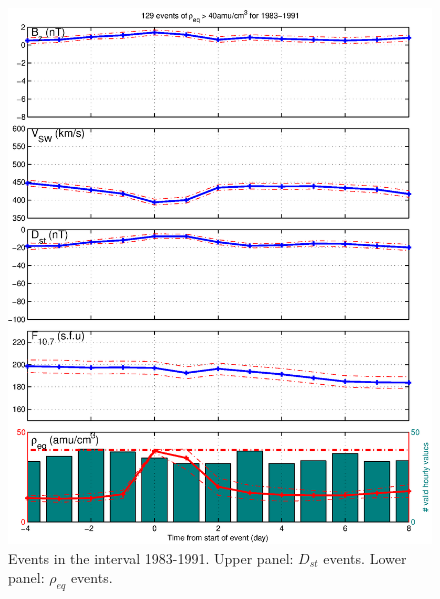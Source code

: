 \documentclass[10pt,twocolumn]{article}
\begin{document}
\begin{figure}[tp!]
\includegraphics[scale=0.40]{paperfigures/stormavs-mass-day.eps}
\caption{Events in the interval 1983-1991.  Upper panel: $D_{st}$ events. Lower panel: $\rho_{eq}$ events.}
\label{DailyAveragesAllData}
\end{figure}
\clearpage
\end{document}
